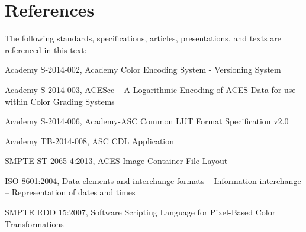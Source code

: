 \numberedformat
\chapter{References}
The following standards, specifications, articles, presentations, and texts are referenced in this text:

Academy S-2014-002, Academy Color Encoding System - Versioning System 

Academy S-2014-003, ACEScc -- A Logarithmic Encoding of ACES Data for use within Color Grading Systems

Academy S-2014-006, Academy-ASC Common LUT Format Specification v2.0

Academy TB-2014-008, ASC CDL Application

SMPTE ST 2065-4:2013, ACES Image Container File Layout

ISO 8601:2004, Data elements and interchange formats -- Information interchange -- Representation of dates and times

SMPTE RDD 15:2007, Software Scripting Language for Pixel-Based Color Transformations